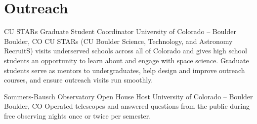 \section{Outreach}

		{CU STARs}
		{Graduate Student Coordinator}
		{University of Colorado -- Boulder}
		{Boulder, CO}
		{
		CU STARs (CU Boulder Science, Technology, and Astronomy RecruitS) visits underserved schools across all of Colorado and gives high school students an opportunity to learn about and engage with space science.
		Graduate students serve as mentors to undergraduates, help design and improve outreach courses, and ensure outreach visits run smoothly.
    	}

    {Sommers-Bausch Observatory Open House Host}
    {}
    {University of Colorado -- Boulder}    
	{Boulder, CO}
    {Operated telescopes and answered questions from the public during free observing nights once or twice per semester.    }

